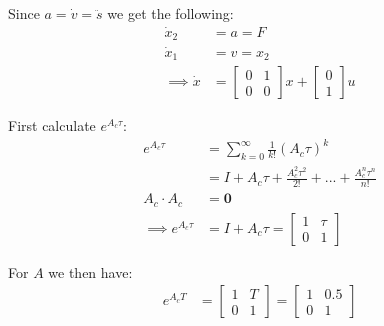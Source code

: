 \documentclass[11pt, a4paper, english]{NTNUoving}
\begin{document}

\begin{oppgave}
    \begin{punkt}
        Since $a = \dot{v} = \ddot{s}$ we get the following:
        \begin{align*}
            \dot{x}_2 &= a = F \\
            \dot{x}_1 &= v = x_2 \\
            \implies \dot{x} &= \begin{bmatrix}
                0 & 1 \\
                0 & 0
            \end{bmatrix}x +
            \begin{bmatrix}
                0 \\ 1
            \end{bmatrix}u
        \end{align*}
    \end{punkt}

    \begin{punkt}
        First calculate $e^{A_c \tau}$:
        \begin{align*}
            e^{A_c \tau} &= \sum_{k=0}^\infty \frac{1}{k!} (A_c \tau)^k \\
            &= I + A_c \tau + \frac{A_c^2 \tau^2}{2!} + ... + \frac{A_c^n \tau^n}{n!} \\
            A_c \cdot A_c &= \mathbf{0} \\
            \implies e^{A_c \tau} &= I + A_c \tau = \begin{bmatrix}
                1 & \tau \\
                0 & 1
            \end{bmatrix}
        \end{align*}

        For $A$ we then have:
        \begin{align*}
            e^{A_c T} &= \begin{bmatrix}
                1 & T \\
                0 & 1
            \end{bmatrix} = \begin{bmatrix}
                1 & 0.5 \\
                0 & 1
            \end{bmatrix}
        \end{align*}


\end{punkt}
\end{oppgave}
\end{document}
